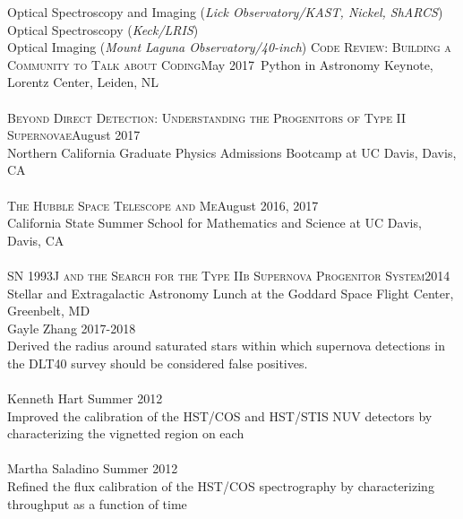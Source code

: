 \documentclass[10pt]{cv}
\begin{document}
\begin{llist}
%
\vspace{-0.1in}   
Optical Spectroscopy and Imaging ({\it Lick Observatory/KAST, Nickel, ShARCS})\\
Optical Spectroscopy ({\it Keck/LRIS})\\
Optical Imaging ({\it Mount Laguna Observatory/40-inch})
\vspace{-0.1in}  
\textsc{Code Review: Building a Community to Talk about Coding}\hfill May 2017\
Python in Astronomy Keynote, Lorentz Center, Leiden, NL\\
\\
\textsc{Beyond Direct Detection: Understanding the Progenitors of Type II Supernovae}\hfill August 2017\\
Northern California Graduate Physics Admissions Bootcamp at UC Davis, Davis, CA\\
\\
\textsc{The Hubble Space Telescope and Me}\hfill August 2016, 2017\\
California State Summer School for Mathematics and Science at UC Davis, Davis, CA\\
\\
\textsc{SN 1993J and the Search for the Type IIb Supernova Progenitor System}\hfill 2014\\
Stellar and Extragalactic Astronomy Lunch at the Goddard Space Flight Center, Greenbelt, MD\\
\vspace{-0.1in}  
Gayle Zhang \hfill 2017-2018\\
Derived the radius around saturated stars within which supernova detections in 
the DLT40 survey should be considered false positives.\\
\\
Kenneth Hart \hfill Summer 2012\\
Improved the calibration of the HST/COS and HST/STIS NUV detectors by 
characterizing the vignetted region on each\\
\\
\clearpage
Martha Saladino \hfill Summer 2012\\
Refined the flux calibration of the HST/COS spectrography by characterizing  
throughput as a function of time\\

\end{llist}
\end{document}

